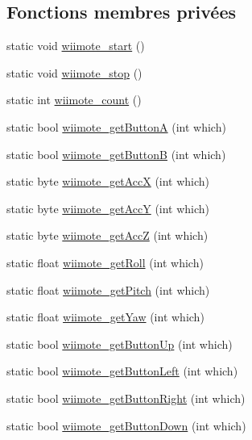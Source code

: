 \subsection*{Fonctions membres privées}
\begin{DoxyCompactItemize}
\item 
static void \hyperlink{class_music_a69b2158924c1cf3b72d8ad0aa31169b6}{wiimote\+\_\+start} ()
\item 
static void \hyperlink{class_music_ad87bc9d22b95c82090707ddc53ed5da8}{wiimote\+\_\+stop} ()
\item 
static int \hyperlink{class_music_a40595d7c6af2acb00fb2bb7841cb5f67}{wiimote\+\_\+count} ()
\item 
static bool \hyperlink{class_music_a0da54a9b72517be2ef96b56817730de4}{wiimote\+\_\+get\+Button\+A} (int which)
\item 
static bool \hyperlink{class_music_afa8c29f119c92db2e15df93fadb11008}{wiimote\+\_\+get\+Button\+B} (int which)
\item 
static byte \hyperlink{class_music_aee0db5bd6d8dcda6638368322eee4c85}{wiimote\+\_\+get\+Acc\+X} (int which)
\item 
static byte \hyperlink{class_music_a3a575f1623e1d8f08f9ef6a0fa3c0971}{wiimote\+\_\+get\+Acc\+Y} (int which)
\item 
static byte \hyperlink{class_music_a98817ef086d8628dbefb97c6dcc16784}{wiimote\+\_\+get\+Acc\+Z} (int which)
\item 
static float \hyperlink{class_music_acb804430cb256e5eed4c2f25e9792241}{wiimote\+\_\+get\+Roll} (int which)
\item 
static float \hyperlink{class_music_ab6d783cc9a08de26e36401ecefd0169f}{wiimote\+\_\+get\+Pitch} (int which)
\item 
static float \hyperlink{class_music_a8671f54d1c3d75b602c79e6b39c9707a}{wiimote\+\_\+get\+Yaw} (int which)
\item 
static bool \hyperlink{class_music_abe16123b93a805449f5125f3a461c704}{wiimote\+\_\+get\+Button\+Up} (int which)
\item 
static bool \hyperlink{class_music_a2684a38f892873250a4b720434c1a548}{wiimote\+\_\+get\+Button\+Left} (int which)
\item 
static bool \hyperlink{class_music_a4d3a8be82426aede2dcb42cd2618e93d}{wiimote\+\_\+get\+Button\+Right} (int which)
\item 
static bool \hyperlink{class_music_a7c5e9399a60e57bebf5c2e18b54ef499}{wiimote\+\_\+get\+Button\+Down} (int which)
\item 

\end{DoxyCompactItemize}
